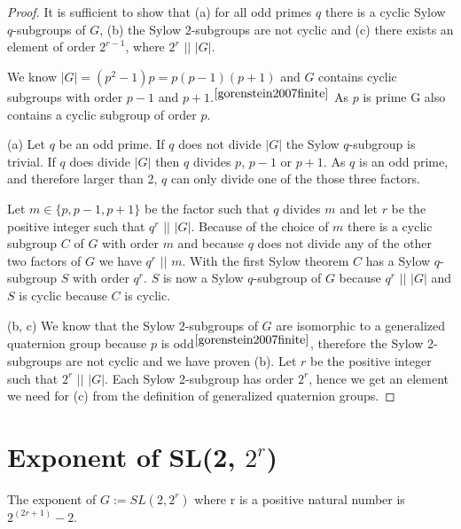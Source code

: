 \documentclass[a4paper,10pt]{article}
\begin{document}
\begin{proof}
	It is sufficient to show that (a) for all odd primes $q$ there is a cyclic Sylow $q$-subgroups of $G$, (b) the Sylow $2$-subgroups are not cyclic and (c) there exists an element of order $2^{r-1}$, where $2^r$ $\vert\vert$ $|G|$.

	We know $|G| = (p^2-1)p = p(p-1)(p+1)$ and $G$ contains cyclic subgroups with order $p-1$ and $p+1$.$^{\cite{gorenstein2007finite}}$ As $p$ is prime G also contains a cyclic subgroup of order $p$.

	(a) Let $q$ be an odd prime. If $q$ does not divide $|G|$ the Sylow $q$-subgroup is trivial. If $q$ does divide $|G|$ then $q$ divides $p$, $p-1$ or $p+1$. As $q$ is an odd prime, and therefore larger than 2, $q$ can only divide one of the those three factors. 

	Let $m \in \{ p, p-1, p+1\}$ be the factor such that $q$ divides $m$ and let $r$ be the positive integer such that $q^r$ $\vert\vert$ $|G|$. Because of the choice of $m$ there is a cyclic subgroup $C$ of $G$ with order $m$ and because $q$ does not divide any of the other two factors of $G$ we have $q^r$ $\vert\vert$ $m$. With the first Sylow theorem $C$ has a Sylow $q$-subgroup $S$ with order $q^r$. $S$ is now a Sylow $q$-subgroup of $G$ because $q^r$ $\vert\vert$ $|G|$ and $S$ is cyclic because $C$ is cyclic. 

	(b, c) We know that the Sylow $2$-subgroups of $G$ are isomorphic to a generalized quaternion group because $p$ is odd$^{\cite{gorenstein2007finite}}$, therefore the Sylow 2-subgroups are not cyclic and we have proven (b). Let $r$ be the positive integer such that $2^r$ $\vert\vert$ $|G|$. Each Sylow 2-subgroup has order $2^r$, hence we get an element we need for (c) from the definition of generalized quaternion groups.
\end{proof}

\section{Exponent of SL(2, $2^r$)}

\begin{theorem}
	The exponent of $G := SL(2, 2^r)$ where r is a positive natural number is $2^{(2r+1)} - 2$.
\end{theorem}
\end{document}
